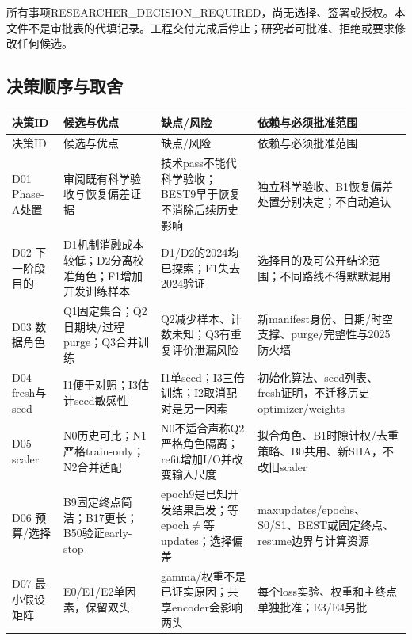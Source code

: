\documentclass[UTF8,fontset=fandol,10pt]{ctexart}
\begin{document}
所有事项RESEARCHER\_\allowbreak{}DECISION\_\allowbreak{}REQUIRED，尚无选择、签署或授权。本文件不是审批表的代填记录。工程交付完成后停止；研究者可批准、拒绝或要求修改任何候选。

\subsection{决策顺序与取舍}

\begingroup\small\setlength{\tabcolsep}{3pt}\renewcommand{\arraystretch}{1.12}
\begin{longtable}{>{\raggedright\arraybackslash}p{\dimexpr(\linewidth-8\tabcolsep)/4\relax}>{\raggedright\arraybackslash}p{\dimexpr(\linewidth-8\tabcolsep)/4\relax}>{\raggedright\arraybackslash}p{\dimexpr(\linewidth-8\tabcolsep)/4\relax}>{\raggedright\arraybackslash}p{\dimexpr(\linewidth-8\tabcolsep)/4\relax}}
\toprule
决策ID & 候选与优点 & 缺点/\allowbreak{}风险 & 依赖与必须批准范围 \\
\midrule\endfirsthead
决策ID & 候选与优点 & 缺点/\allowbreak{}风险 & 依赖与必须批准范围 \\
\midrule\endhead
D01 Phase-A处置 & 审阅既有科学验收与恢复偏差证据 & 技术pass不能代科学验收；BEST9早于恢复不消除后续历史影响 & 独立科学验收、B1恢复偏差处置分别决定；不自动追认 \\
D02 下一阶段目的 & D1机制消融成本较低；D2分离校准角色；F1增加开发训练样本 & D1/\allowbreak{}D2的2024均已探索；F1失去2024验证 & 选择目的及可公开结论范围；不同路线不得默默混用 \\
D03 数据角色 & Q1固定集合；Q2日期块/\allowbreak{}过程purge；Q3合并训练 & Q2减少样本、计数未知；Q3有重复评价泄漏风险 & 新manifest身份、日期/\allowbreak{}时空支撑、purge/\allowbreak{}完整性与2025防火墙 \\
D04 fresh与seed & I1便于对照；I3估计seed敏感性 & I1单seed；I3三倍训练；I2取消配对是另一因素 & 初始化算法、seed列表、fresh证明，不迁移历史optimizer/\allowbreak{}weights \\
D05 scaler & N0历史可比；N1严格train-only；N2合并适配 & N0不适合声称Q2严格角色隔离；refit增加I/\allowbreak{}O并改变输入尺度 & 拟合角色、B1时隙计权/\allowbreak{}去重策略、B0共用、新SHA，不改旧scaler \\
D06 预算/\allowbreak{}选择 & B9固定终点简洁；B17更长；B50验证early-stop & epoch9是已知开发结果启发；等epoch\(\ne\)等updates；选择偏差 & maxupdates/\allowbreak{}epochs、S0/\allowbreak{}S1、BEST或固定终点、resume边界与计算资源 \\
D07 最小假设矩阵 & E0/\allowbreak{}E1/\allowbreak{}E2单因素，保留双头 & gamma/\allowbreak{}权重不是已证实原因；共享encoder会影响两头 & 每个loss实验、权重和主终点单独批准；E3/\allowbreak{}E4另批 \\

\end{longtable}
\end{document}
